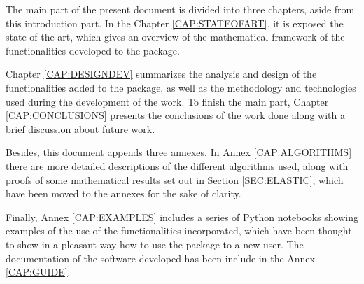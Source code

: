 The main part of the present document is divided into three chapters, aside from
this introduction part. In the Chapter \ref{CAP:STATEOFART}, it is exposed the
state of the art, which gives an overview of the mathematical framework of the
functionalities developed to the package.

Chapter \ref{CAP:DESIGNDEV} summarizes the analysis and design of the
functionalities added to the package, as well as the methodology and
technologies used during the development of the work. To finish the main part,
Chapter \ref{CAP:CONCLUSIONS} presents the conclusions of the work done along
with a brief discussion about future work.

Besides, this document appends three annexes. In Annex \ref{CAP:ALGORITHMS} there are
more detailed descriptions of the different algorithms used, along with proofs of
some mathematical results set out
in Section \ref{SEC:ELASTIC}, which have been moved to the annexes for the
sake of clarity.

Finally, Annex \ref{CAP:EXAMPLES} includes a series of Python notebooks showing
examples of the use of the functionalities incorporated, which have been thought
to show in a pleasant way how to use the package to a new user. The
documentation of the software developed has been include in the
Annex \ref{CAP:GUIDE}.
